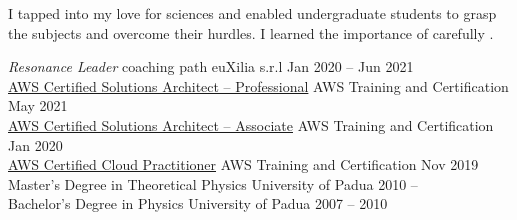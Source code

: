 \documentclass[
  fontsize=9pt,
  DIV=calc,
  parskip=half,
]{scrartcl}
\def\Phi{1.618}
\newlength{\Pad}\setlength{\Pad}{14.562pt} %
\begin{document}
I tapped into my love for sciences and enabled undergraduate students to grasp
the subjects and overcome their hurdles. I learned the importance of carefully
.



\Event
  {\emph{Resonance Leader} coaching path}
  {euXilia s.r.l}%
  {Jan 2020 -- Jun 2021}\\
\Event
  {\href{https://www.credly.com/badges/37aaaf27-3a2e-436d-9195-db4f46eb222e/public_url}
  {%
   AWS Certified Solutions Architect -- Professional}}
  {AWS Training and Certification}
  {May 2021}\\
\Event
  {\href{https://www.credly.com/badges/d092afab-f194-4074-ade6-78728c854faa/public_url}
  {%
   AWS Certified Solutions Architect -- Associate}}
  {AWS Training and Certification}
  {Jan 2020}\\
\Event
  {\href{https://www.credly.com/badges/d268e963-65ba-462b-a835-f65a7baccccd/public_url}
  {%
   AWS Certified Cloud Practitioner}}
  {AWS Training and Certification}
  {Nov 2019}\\
\Event
  {Master's Degree in Theoretical Physics}
  {University of Padua}
  {2010 -- }\\
\Event
  {Bachelor's Degree in Physics}
  {University of Padua}
  {2007 -- 2010}\\
\end{document}
